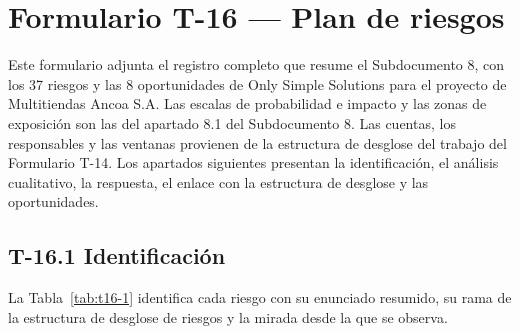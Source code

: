 \documentclass[11pt]{article}
\begin{document}
\tableofcontents
\clearpage

\renewcommand{\tablename}{Tabla}
\renewcommand{\thetable}{T-16.\arabic{table}}

\section{Formulario T-16 — Plan de riesgos}\label{formulario-t-16}

Este formulario adjunta el registro completo que resume el Subdocumento 8, con los 37 riesgos y las 8 oportunidades de Only Simple Solutions para el proyecto de Multitiendas Ancoa S.A. Las escalas de probabilidad e impacto y las zonas de exposición son las del apartado 8.1 del Subdocumento 8. Las cuentas, los responsables y las ventanas provienen de la estructura de desglose del trabajo del Formulario T-14. Los apartados siguientes presentan la identificación, el análisis cualitativo, la respuesta, el enlace con la estructura de desglose y las oportunidades.

\subsection{T-16.1 Identificación}

La Tabla~\mbox{\ref{tab:t16-1}} identifica cada riesgo con su enunciado resumido, su rama de la estructura de desglose de riesgos y la mirada desde la que se observa.
\end{document}
